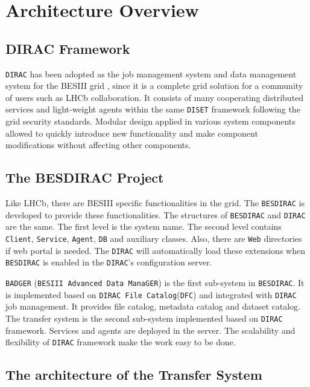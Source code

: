 \section{Architecture Overview}

\subsection{DIRAC Framework}

{\tt DIRAC} \cite{bib:dirac3,bib:diracgit} 
has been adopted as the job management system and data management
system for the BESIII grid \cite{bib:besdfc}, since 
it is a complete grid solution for a community of users such as
LHCb collaboration.
It consists of many cooperating distributed services and light-weight
agents within the same {\tt DISET} framework following the grid
security standards.
Modular design applied in various system components allowed to quickly
introduce new functionality and make component modifications without
affecting other components.

\subsection{The BESDIRAC Project}

Like LHCb, there are BESIII specific functionalities in the grid.
The {\tt BESDIRAC} \cite{bib:besdirac} 
is developed to provide these functionalities.
The structures of {\tt BESDIRAC} and {\tt DIRAC} are the same.
The first level is the system name. The second level contains
{\tt Client}, {\tt Service}, {\tt Agent}, {\tt DB} and auxiliary classes.
Also, there are {\tt Web} directories if web portal is needed.
The {\tt DIRAC} will automatically load these extensions when 
{\tt BESDIRAC} is enabled in the {\tt DIRAC}'s configuration server.

{\tt BADGER} (\verb"BESIII Advanced Data ManaGER") is the first sub-system
in {\tt BESDIRAC}. It is implemented based on {\tt DIRAC File
Catalog}(\verb"DFC")
and integrated with {\tt DIRAC} job management.
It provides file catalog, metadata catalog and dataset catalog.
%
The transfer system is the second sub-system implemented based on
{\tt DIRAC} framework. Services and agents are deployed in the server.
The scalability and flexibility of {\tt DIRAC} framework make the work
easy to be done. 

\subsection{The architecture of the Transfer System}

